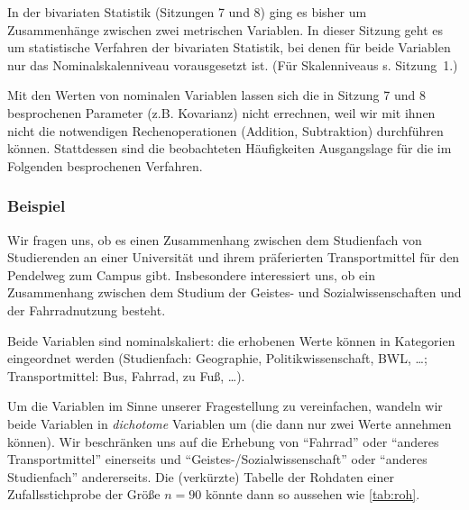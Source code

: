 \documentclass[
  ngerman,
]{article}
\begin{document}
In der bivariaten Statistik (Sitzungen 7 und 8) ging es bisher um Zusammenhänge zwischen zwei metrischen Variablen. In dieser Sitzung geht es um statistische Verfahren der bivariaten Statistik, bei denen für beide Variablen nur das Nominalskalenniveau vorausgesetzt ist. (Für Skalenniveaus s. Sitzung~1.)

Mit den Werten von nominalen Variablen lassen sich die in Sitzung 7 und 8 besprochenen Parameter (z.B. Kovarianz) nicht errechnen, weil wir mit ihnen nicht die notwendigen Rechenoperationen (Addition, Subtraktion) durchführen können. Stattdessen sind die beobachteten Häufigkeiten Ausgangslage für die im Folgenden besprochenen Verfahren.

\hypertarget{beispiel-29}{%
\subsubsection{Beispiel}\label{beispiel-29}}

Wir fragen uns, ob es einen Zusammenhang zwischen dem Studienfach von Studierenden an einer Universität und ihrem präferierten Transportmittel für den Pendelweg zum Campus gibt. Insbesondere interessiert uns, ob ein Zusammenhang zwischen dem Studium der Geistes- und Sozialwissenschaften und der Fahrradnutzung besteht.

Beide Variablen sind nominalskaliert: die erhobenen Werte können in Kategorien eingeordnet werden (Studienfach: Geographie, Politikwissenschaft, BWL, \ldots; Transportmittel: Bus, Fahrrad, zu Fuß, \ldots).

Um die Variablen im Sinne unserer Fragestellung zu vereinfachen, wandeln wir beide Variablen in \emph{dichotome} Variablen um (die dann nur zwei Werte annehmen können). Wir beschränken uns auf die Erhebung von ``Fahrrad'' oder ``anderes Transportmittel'' einerseits und ``Geistes-/Sozialwissenschaft'' oder ``anderes Studienfach'' andererseits. Die (verkürzte) Tabelle der Rohdaten einer Zufallsstichprobe der Größe \(n=90\) könnte dann so aussehen wie \autoref{tab:roh}.
\end{document}
